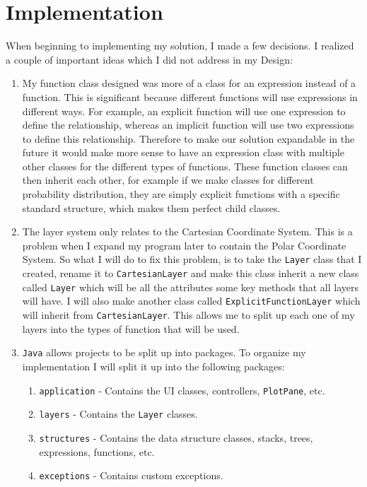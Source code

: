 \documentclass[../../../main.tex]{subfiles}
\begin{document}
\chapter{Implementation}
When beginning to implementing my solution, I made a few decisions. I realized a couple of important ideas which I did not address in my Design:
\begin{enumerate}
\item My function class designed was more of a class for an expression instead of a function. This is significant because different functions will use expressions in different ways. For example, an explicit function will use one expression to define the relationship, whereas an implicit function will use two expressions to define this relationship. Therefore to make our solution expandable in the future it would make more sense to have an expression class with multiple other classes for the different types of functions. These function classes can then inherit each other, for example if we make classes for different probability distribution, they are simply explicit functions with a specific standard structure, which makes them perfect child classes.
\item The layer system only relates to the Cartesian Coordinate System. This is a problem when I expand my program later to contain the Polar Coordinate System. So what I will do to fix this problem, is to take the \texttt{Layer} class that I created, rename it to \texttt{CartesianLayer} and make this class inherit a new class called \texttt{Layer} which will be all the attributes some key methods that all layers will have. I will also make another class called \texttt{ExplicitFunctionLayer} which will inherit from \texttt{CartesianLayer}. This allows me to split up each one of my layers into the types of function that will be used.
\item \texttt{Java} allows projects to be split up into packages. To organize my implementation I will split it up into the following packages:
	\begin{enumerate}
	\item \texttt{application} - Contains the UI classes, controllers, \texttt{PlotPane}, etc.
	\item \texttt{layers} - Contains the \texttt{Layer} classes.
	\item \texttt{structures} - Contains the data structure classes, stacks, trees, expressions, functions, etc.
	\item \texttt{exceptions} - Contains custom exceptions.
	\end{enumerate}
\end{enumerate}

\newpage
\end{document}
